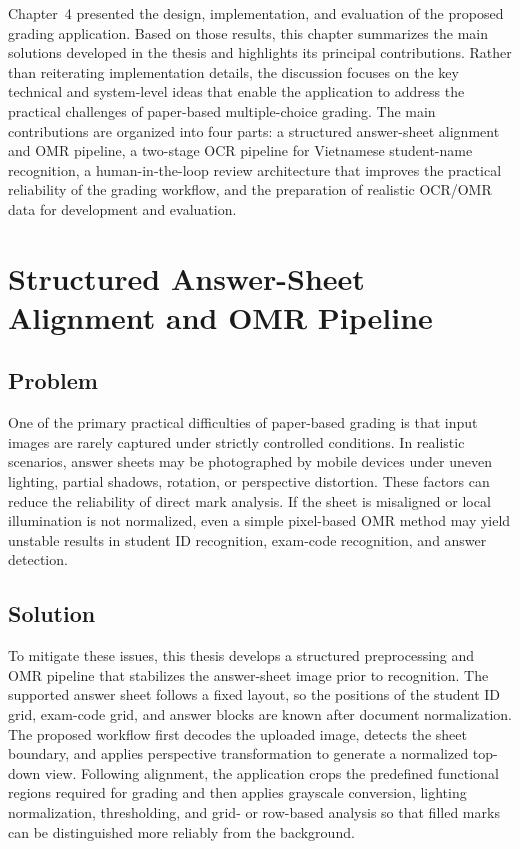 \documentclass[../Main.tex]{subfiles}
\begin{document}
Chapter~4 presented the design, implementation, and evaluation of the proposed grading application. Based on those results, this chapter summarizes the main solutions developed in the thesis and highlights its principal contributions. Rather than reiterating implementation details, the discussion focuses on the key technical and system-level ideas that enable the application to address the practical challenges of paper-based multiple-choice grading. The main contributions are organized into four parts: a structured answer-sheet alignment and OMR pipeline, a two-stage OCR pipeline for Vietnamese student-name recognition, a human-in-the-loop review architecture that improves the practical reliability of the grading workflow, and the preparation of realistic OCR/OMR data for development and evaluation.

\section{Structured Answer-Sheet Alignment and OMR Pipeline}
\label{section:5.1}

\subsection{Problem}
\label{subsection:5.1.1}

One of the primary practical difficulties of paper-based grading is that input images are rarely captured under strictly controlled conditions. In realistic scenarios, answer sheets may be photographed by mobile devices under uneven lighting, partial shadows, rotation, or perspective distortion. These factors can reduce the reliability of direct mark analysis. If the sheet is misaligned or local illumination is not normalized, even a simple pixel-based OMR method may yield unstable results in student ID recognition, exam-code recognition, and answer detection.

\subsection{Solution}
\label{subsection:5.1.2}

To mitigate these issues, this thesis develops a structured preprocessing and
OMR pipeline that stabilizes the answer-sheet image prior to recognition. The
supported answer sheet follows a fixed layout, so the positions of the student
ID grid, exam-code grid, and answer blocks are known after document
normalization. The proposed workflow first decodes the uploaded image, detects
the sheet boundary, and applies perspective transformation to generate a
normalized top-down view. Following alignment, the application crops the
predefined functional regions required for grading and then applies grayscale
conversion, lighting normalization, thresholding, and grid- or row-based
analysis so that filled marks can be distinguished more reliably from the
background.
\end{document}
